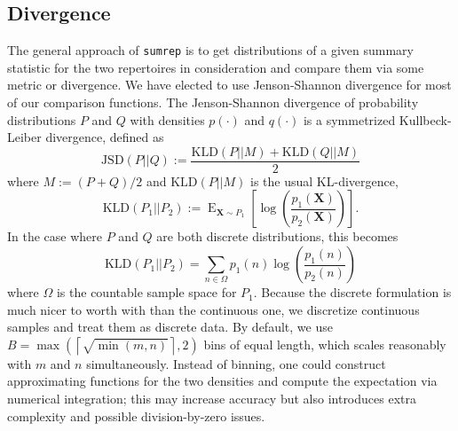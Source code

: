 \documentclass{article}
\begin{document}
\subsection*{Divergence}
The general approach of \texttt{sumrep} is to get distributions of a given summary statistic for the two repertoires in consideration and compare them via some metric or divergence.
We have elected to use Jenson-Shannon divergence for most of our comparison functions.
The Jenson-Shannon divergence of probability distributions $P$ and $Q$ with densities $p(\cdot)$ and $q(\cdot)$ is a symmetrized Kullbeck-Leiber divergence, defined as
\begin{equation}
\text{JSD}\left(P || Q\right) := \frac{\text{KLD}\left(P || M\right) + \text{KLD}\left(Q || M\right)}{2}
\end{equation}
where $M := (P + Q)/2$ and $\text{KLD}(P || M)$ is the usual KL-divergence,
\begin{equation}
\text{KLD}\left(P_1 || P_2\right) := \operatorname{E}_{\mathbf X \sim P_1}\left[ \log\left(\frac{p_1(\mathbf X)}{p_2(\mathbf X)}\right) \right].
\end{equation}
In the case where $P$ and $Q$ are both discrete distributions, this becomes
\begin{equation}
\text{KLD}\left(P_1 || P_2\right) = \sum_{n \in \Omega} p_1(n) \log\left( \frac{p_1(n)}{p_2(n)} \right)
\end{equation}
where $\Omega$ is the countable sample space for $P_1$.
Because the discrete formulation is much nicer to worth with than the continuous one, we discretize continuous samples and treat them as discrete data.
By default, we use $B = \max\left(\left\lceil \sqrt{\min(m, n)} \right \rceil, 2\right)$ bins of equal length, which scales reasonably with $m$ and $n$ simultaneously.
Instead of binning, one could construct approximating functions for the two densities and compute the expectation via numerical integration; this may increase accuracy but also introduces extra complexity and possible division-by-zero issues.
\end{document}
